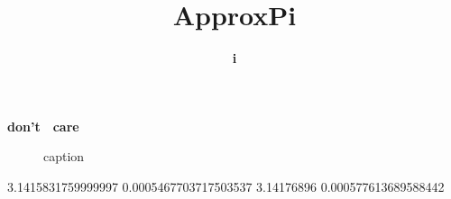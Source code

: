 \documentclass[12pt]{article}
\title{ApproxPi}
\date{\textbf{i}}
\author{}
\begin{document}
    \begin{titlepage}
        \maketitle
        \center
        \textbf{\large{don't}}\ \
        \textbf{\large{care}}\ \
        \tableofcontents
    \end{titlepage}
    
    \begin{figure}[H]
        \begin{center}
           \scalebox{.7}{}
           \caption{caption}
           \label{2}
        \end{center}
    \end{figure}
    
    3.1415831759999997 0.0005467703717503537
    3.14176896 0.000577613689588442
\end{document}
